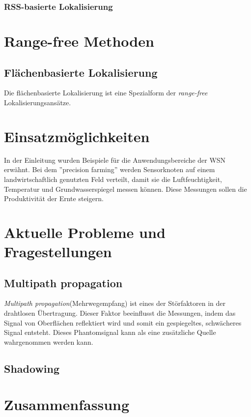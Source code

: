 \documentclass[12pt, a4wide]{scrreprt}
\begin{document}
    \subsection{RSS-basierte Lokalisierung}

\chapter{Range-free Methoden}
    \section{Flächenbasierte Lokalisierung}
Die flächenbasierte Lokalisierung ist eine Spezialform der \textit{range-free} Lokalisierungsansätze.

\chapter{Einsatzmöglichkeiten}
In der Einleitung wurden Beispiele für die Anwendungsbereiche der \acs{WSN} erwähnt. Bei dem ''precision farming'' werden Sensorknoten auf einem landwirtschaftlich genutzten Feld verteilt, damit sie die Luftfeuchtigkeit, Temperatur und Grundwasserspiegel messen können. Diese Messungen sollen die Produktivität der Ernte steigern.
\chapter{Aktuelle Probleme und Fragestellungen}
  \section{Multipath propagation}
\textit{Multipath propagation}(Mehrwegempfang) ist eines der Störfaktoren in der drahtlosen Übertragung. Dieser Faktor beeinflusst die Messungen, indem das Signal von Oberflächen reflektiert wird und somit ein gespiegeltes, schwächeres Signal entsteht. Dieses Phantomsignal kann als eine zusätzliche Quelle wahrgenommen werden kann.
  \section{Shadowing}

\chapter{Zusammenfassung}

\newpage


\nocite{*}
\end{document}
